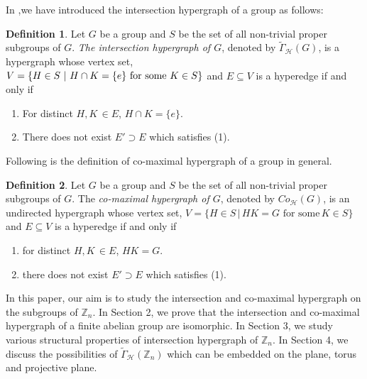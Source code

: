 \documentclass[11pt,a4paper]{article}
\theoremstyle{definition}
\newtheorem{defn}{Definition}[section]
\theoremstyle{remark}
\begin{document}
In \cite{sb},we have introduced the intersection hypergraph of a group as follows:
		\begin{defn}
		Let $G$ be a group and $S$ be the set of all non-trivial proper subgroups of $G$. \textit{The intersection hypergraph of $G$}, denoted by $\tilde{\Gamma}_\mathcal{H}(G)$, is a hypergraph whose vertex set,\\ $V =\{H \in S \,\, | \,\, H \cap K = \{e\} \,\, \text{for some $ K \in S $} \}$ and $E \subseteq V$ is a hyperedge if and only if \begin{enumerate}
			\item For distinct $H,K \, \in E$, $H \cap K = \{e\}.$
			\item There does not exist  $E' \supset E$ which  satisfies (1).
		\end{enumerate}
		
	\end{defn}
\noindent Following is the definition of co-maximal hypergraph of a group in general.
		\begin{defn}
		Let $G$ be a group and $S$ be the set of all non-trivial proper subgroups of $G$. The \textit{co-maximal hypergraph of $G$}, denoted by $Co_{\mathcal{H}}(G)$, is an undirected hypergraph whose vertex set, $V=\{H \in S \, | \, HK=G \,\, \text{for some} \, K \in S\}$ and $E \subseteq V$ is a hyperedge if and only if \begin{enumerate}
			\item for distinct $H,K \, \in E$, $HK = G.$
			\item there does not exist  $E' \supset E$ which  satisfies (1).
		\end{enumerate}
	\end{defn}
	
	In this paper, our aim is to study the intersection and co-maximal hypergraph on the subgroups of $\mathbb{Z}_n$.  In Section 2, we prove that the intersection and co-maximal hypergraph of a finite abelian group  are isomorphic. In Section 3, we study various structural properties of intersection hypergraph of $\mathbb{Z}_n$. In Section 4,  we  discuss the possibilities of $\tilde{\Gamma}_\mathcal{H}(\mathbb{Z}_n)$ which can be embedded on the plane, torus and projective plane.
	
\end{document}
